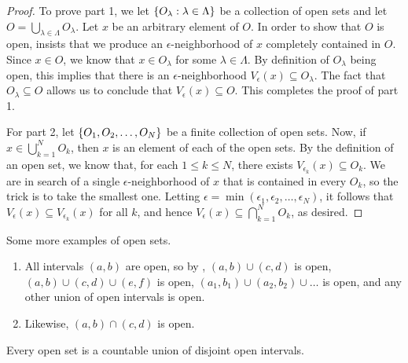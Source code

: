 \begin{proof}
  To prove part 1, we let $\{ O_\lambda : \lambda \in \Lambda \}$ be
  a collection of open sets and let $O = \bigcup_{\lambda \in
  \Lambda} O_\lambda$. Let $x$ be an arbitrary element of $O$. In
  order to show that $O$ is open,  insists that we
  produce an $\epsilon$-neighborhood of $x$ completely contained in
  $O$. Since $x \in O$, we know that $x \in O_\lambda$ for some
  $\lambda \in \Lambda$. By definition of $O_\lambda$ being open,
  this implies that there is an $\epsilon$-neighborhood
  $V_\epsilon(x) \subseteq O_\lambda$. The fact that $O_\lambda
  \subseteq O$ allows us to conclude that $V_\epsilon(x) \subseteq
  O$. This completes the proof of part 1.

  For part 2, let $\{ O_1, O_2, \dots, O_N \}$ be a finite collection
  of open sets. Now, if $x \in \bigcup_{k = 1}^{N} O_k$, then $x$ is
  an element of each of the open sets. By the definition of an open
  set, we know that, for each $1 \leq k \leq N$, there exists
  $V_{\epsilon_k}(x) \subseteq O_k$. We are in search of a single
  $\epsilon$-neighborhood of $x$ that is contained in every $O_k$, so
  the trick is to take the smallest one. Letting $\epsilon =
  \min(\epsilon_1, \epsilon_2, \dots, \epsilon_N)$, it follows that
  $V_\epsilon(x) \subseteq V_{\epsilon_k}(x)$ for all $k$, and hence
  $V_\epsilon(x) \subseteq \bigcap_{k = 1}^{N} O_k$, as desired.
\end{proof}

\begin{example}
  Some more examples of open sets.
  \begin{enumerate}
    \item All intervals $(a, b)$ are open, so by
      , $(a, b) \cup (c,
      d)$ is open, $(a, b) \cup (c, d) \cup (e, f)$ is open, $(a_1,
      b_1) \cup (a_2, b_2) \cup \dots$ is open, and any other union
      of open intervals is open.
    \item Likewise, $(a, b) \cap (c, d)$ is open.
  \end{enumerate}
\end{example}

\begin{theorem}
  Every open set is a countable union of disjoint open intervals.
\end{theorem}

